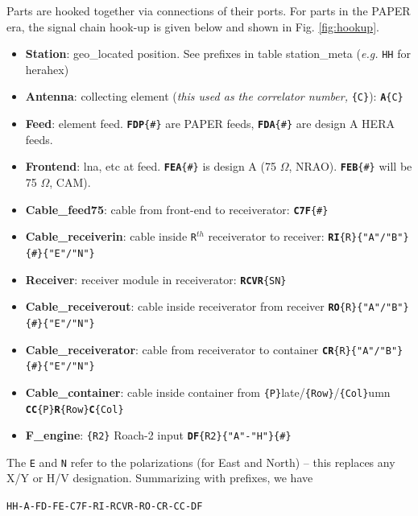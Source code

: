 \documentclass{article}
\begin{document}
Parts are hooked together via connections of their ports.   For parts in the PAPER era, the signal chain hook-up is given below and shown in Fig. \ref{fig:hookup}.
\begin{itemize}\setlength\itemsep{-.3em}
	\item {\bf Station}: geo\_located position.  See prefixes in table station\_meta ({\em e.g.} {\tt HH} for herahex)
	\item {\bf Antenna}:  collecting element ({\em this used as the correlator number,} {\tt \{C\}}):  {\tt{\bf A}\{C\}}
	\item {\bf Feed}:  element feed.  {\tt {\bf FDP}\{\#\}} are PAPER feeds, {\tt {\bf FDA}\{\#\}} are design A HERA feeds.
	\item {\bf Frontend}:  lna, etc at feed.  {\tt {\bf FEA}\{\#\}} is design A (75 $\Omega$, NRAO).  {\tt {\bf FEB}\{\#\}} will be 75 $\Omega$, CAM).
	\item {\bf Cable\_feed75}:  cable from front-end to receiverator: {\tt {\bf C7F}\{\#\}}
	\item {\bf Cable\_receiverin}:  cable inside {\tt R}$^{th}$ receiverator to receiver: {\tt {\bf RI}\{R\}\{"A"/"B"\}\{\#\}\{"E"/"N"\}}
	\item {\bf Receiver}:  receiver module in receiverator: {\tt {\bf RCVR}\{SN\}}
	\item {\bf Cable\_receiverout}:  cable inside receiverator from receiver {\tt {\bf RO}\{R\}\{"A"/"B"\}\{\#\}\{"E"/"N"\}}
	\item {\bf Cable\_receiverator}:  cable from receiverator to container {\tt {\bf CR}\{R\}\{"A"/"B"\}\{\#\}\{"E"/"N"\}}
	\item {\bf Cable\_container}:  cable inside container from {\tt\{P\}}late/{\tt\{Row\}}/{\tt\{Col\}}umn {\tt {\bf CC}\{P\}{\bf R}\{Row\}{\bf C}\{Col\}}
	\item {\bf F\_engine}:  {\tt\{R2\}} Roach-2 input {\tt {\bf DF}\{R2\}\{"A"-"H"\}\{\#\}}
\end{itemize}
The {\tt E} and {\tt N} refer to the polarizations (for East and North) -- this replaces any X/Y or H/V designation.
Summarizing with prefixes, we have 

\vspace{.15in}
\begin{center}
{\tt HH-A-FD-FE-C7F-RI-RCVR-RO-CR-CC-DF}
\end{center}
\vspace{.15in}
\end{document}
